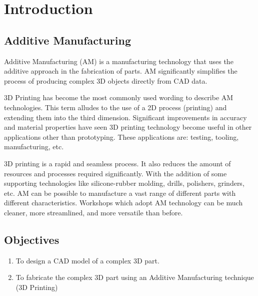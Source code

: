 \chapter{Introduction}
\lhead{\leftmark}
\label{sec:introduction}
\section{Additive Manufacturing}
Additive Manufacturing (AM) is a manufacturing technology that uses the additive approach in the fabrication of parts. AM significantly
simplifies the process of producing complex 3D objects directly from CAD data\cite{edgar2015additive}.

3D Printing has become the most commonly used wording to describe AM technologies. This term alludes to the use of a 2D process (printing) and extending them into the third dimension. Significant improvements in accuracy and material properties have seen 3D printing
technology become useful in other applications other than prototyping. These applications are: testing, tooling, manufacturing, etc. 

3D printing is a rapid and seamless process. It also reduces the amount of resources and processes required significantly. With the addition of some supporting technologies like silicone-rubber
molding, drills, polishers, grinders, etc. AM can be possible to manufacture a vast
range of different parts with different characteristics. Workshops which adopt AM
technology can be much cleaner, more streamlined, and more versatile than before\cite{edgar2015additive}.

\section{Objectives}
\begin{enumerate}
\item To design a CAD model of a complex 3D part.
\item To fabricate the complex 3D part using an Additive Manufacturing technique (3D Printing)
\end{enumerate}
